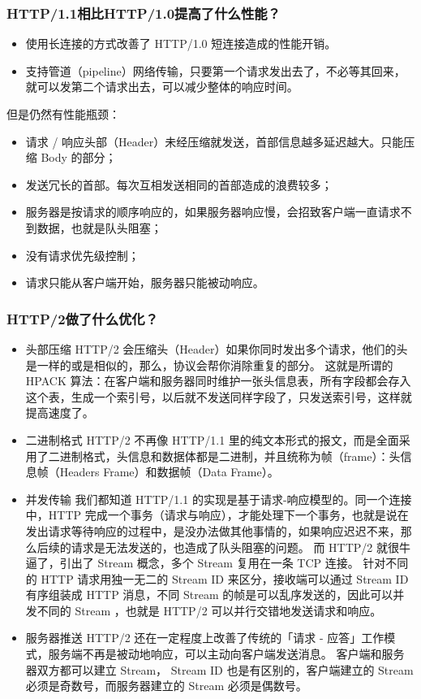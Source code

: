 \documentclass[11pt]{article}
\begin{document}
\subsubsection{HTTP/1.1相比HTTP/1.0提高了什么性能？}
\label{sec:orgba1768a}
\begin{itemize}
\item 使用长连接的方式改善了 HTTP/1.0 短连接造成的性能开销。
\item 支持管道（pipeline）网络传输，只要第一个请求发出去了，不必等其回来，就可以发第二个请求出去，可以减少整体的响应时间。
\end{itemize}
但是仍然有性能瓶颈：
\begin{itemize}
\item 请求 / 响应头部（Header）未经压缩就发送，首部信息越多延迟越大。只能压缩 Body 的部分；
\item 发送冗长的首部。每次互相发送相同的首部造成的浪费较多；
\item 服务器是按请求的顺序响应的，如果服务器响应慢，会招致客户端一直请求不到数据，也就是队头阻塞；
\item 没有请求优先级控制；
\item 请求只能从客户端开始，服务器只能被动响应。
\end{itemize}
\subsubsection{HTTP/2做了什么优化？}
\label{sec:orgd70a597}
\begin{itemize}
\item 头部压缩
HTTP/2 会压缩头（Header）如果你同时发出多个请求，他们的头是一样的或是相似的，那么，协议会帮你消除重复的部分。
这就是所谓的 HPACK 算法：在客户端和服务器同时维护一张头信息表，所有字段都会存入这个表，生成一个索引号，以后就不发送同样字段了，只发送索引号，这样就提高速度了。
\item 二进制格式
HTTP/2 不再像 HTTP/1.1 里的纯文本形式的报文，而是全面采用了二进制格式，头信息和数据体都是二进制，并且统称为帧（frame）：头信息帧（Headers Frame）和数据帧（Data Frame）。
\item 并发传输
我们都知道 HTTP/1.1 的实现是基于请求-响应模型的。同一个连接中，HTTP 完成一个事务（请求与响应），才能处理下一个事务，也就是说在发出请求等待响应的过程中，是没办法做其他事情的，如果响应迟迟不来，那么后续的请求是无法发送的，也造成了队头阻塞的问题。
而 HTTP/2 就很牛逼了，引出了 Stream 概念，多个 Stream 复用在一条 TCP 连接。
针对不同的 HTTP 请求用独一无二的 Stream ID 来区分，接收端可以通过 Stream ID 有序组装成 HTTP 消息，不同 Stream 的帧是可以乱序发送的，因此可以并发不同的 Stream ，也就是 HTTP/2 可以并行交错地发送请求和响应。
\item 服务器推送
HTTP/2 还在一定程度上改善了传统的「请求 - 应答」工作模式，服务端不再是被动地响应，可以主动向客户端发送消息。
客户端和服务器双方都可以建立 Stream， Stream ID 也是有区别的，客户端建立的 Stream 必须是奇数号，而服务器建立的 Stream 必须是偶数号。
\end{itemize}
\end{document}
